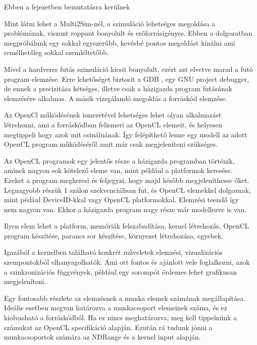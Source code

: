 
Ebben a fejezetben bemutatásra kerülnek

Mint látni lehet a Multi2Sim-nél, a szimuláció lehetséges megoldása a problémának, viszont roppant bonyolult és erőforrásigényes. Ebben a dolgozatban megpróbálunk egy sokkal egyszerűbb, kevésbé pontos megoldást kínálni ami remélhetőleg sokkal szemléltetőbb. 

Mivel a hardveres futás szimuláció kicsit bonyolult, ezért azt elvetve marad a futó program elemzése. Erre lehetőséget biztosít a GDB \cite{gdb}, egy GNU project debugger, de ennek a precizitása kétséges, illetve csak a házigazda program futásának elemzésére alkalmas. A másik vizsgálandó megoldás a forráskód elemzése.

Az OpenCl működésének ismeretével lehetséges lehet olyan alkalmazást létrehozni, ami a forráskódban felismeri az OpenCL elemeit, és helyesen megtippeli hogy azok mit csinálnának. Így felépíthető lenne egy modell az adott OpenCL program működéséről amit már csak megjeleníteni szükséges.
 
Az OpenCL programok egy jelentős része a házigazda programban történik, aminek nagyon sok kötelező eleme van, mint például a platformok keresése. Ezeket a program megkeresi és feljegyzi, hogy majd később megjeleníthesse őket. Legnagyobb részük 1 szálon szekvenciálisan fut, és OpenCL elemekkel dolgoznak, mint pédául DeviceID-kkal vagy OpenCL platformokkal. Elemzési teendő így nem nagyon van. Ekkor a házigazda program nagy része már modellezve is van.

Ilyen elem lehet a platform, memóriák felszabadítása, kernel létrehozás, OpenCL program készítése, parancs sor készítése, környezet létrehozása, egyebek.



Igazából a kernelben található konkrét műveletek elemzési, vizualizációs szempontokból elhanyagolhatók. Ami ott fontos és ajánlott vele foglalkozni, azok a szinkronizációs függvények, például egy sorompót érdemes lehet grafikusan megjeleníteni.

Egy fontosabb részlete az elemzésnek a munka elemek számának megállapítása. Ideális esetben megvan határozva a munkacsoport elemeinek száma, és ez kiolvasható a forráskódból. Ha ez nincs meghatározva, meg kell tippelnünk a számukat az OpenCL specifikáció alapján. Ezután rá tudunk jönni a munkacsoportok számára az NDRange és a kernel input alapján.

